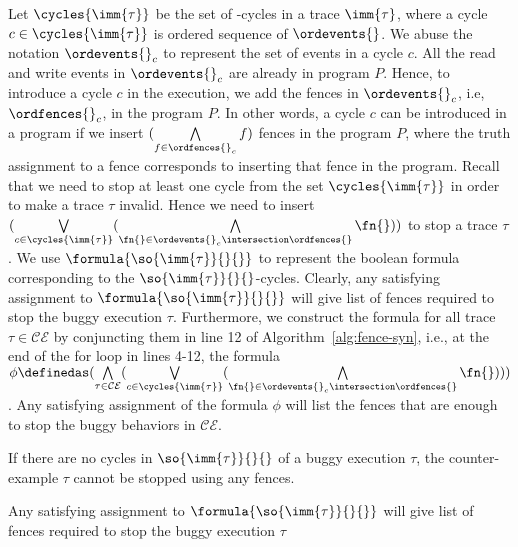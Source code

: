 Let $ \cycles{\imm{\tau}} $ be the set of \lso-cycles in a trace $ \imm{\tau} $, 
where a cycle $ c \in \cycles{\imm{\tau}} $ is ordered sequence of 
$ \ordevents{\sc} $. We abuse the notation $\ordevents{\sc}_c$ to 
represent the set of events in a cycle $ c $. 
All the read and write events in $\ordevents{\sc}_c$ are already in program $ P $. 
Hence, to introduce a cycle $ c $ in the execution, we add the fences in $\ordevents{\sc}_c$, i.e, 
$\ordfences{\sc}_c$, in the program $ P $.
In other words, a cycle $ c $ can be introduced in a program if we insert 
$ (\bigwedge\limits_{f \in \ordfences{\sc}_c} f)$ fences in the program $ P $, 
where the truth assignment to a fence corresponds to inserting that fence 
in the program.
Recall that we need to stop at least one cycle from the set 
$ \cycles{\imm{\tau}} $ in order to make a trace $ \tau $ invalid.
Hence we need to insert $ (\bigvee\limits_{c \in \cycles{\imm{\tau}}} (\bigwedge\limits_{\fn{} \in \ordevents{\sc}_c \intersection 
\ordfences{\sc}} \fn{})) $ to stop a trace $ \tau $. 
We use $\formula{\so{\imm{\tau}}{}{}}$ to represent the boolean formula 
corresponding to the $ \so{\imm{\tau}}{}{} $-cycles.
Clearly, any satisfying assignment to $ \formula{\so{\imm{\tau}}{}{}} $ 
will give list of fences required to stop the buggy execution $ \tau $.
%
Furthermore, we construct the formula for all trace 
$ \tau \in \mathcal{CE} $ by conjuncting them in 
line 12 of Algorithm~\ref{alg:fence-syn}, i.e., 
at the end of the for loop in lines 4-12, the formula 
$ \phi \definedas (\bigwedge\limits_{\tau \in \mathcal{CE}} 
(\bigvee\limits_{c \in \cycles{\imm{\tau}}} 
(\bigwedge\limits_{\fn{} \in \ordevents{\sc}_c \intersection \ordfences{\sc}} \fn{}))) $.
Any satisfying assignment of the formula $\phi$ will list the fences that 
are enough to stop the buggy behaviors in $ \mathcal{CE} $.


\begin{lemma}
	If there are no cycles in $\so{\imm{\tau}}{}{}$ of a buggy execution 
	$\tau$, the counter-example $ \tau $ cannot be stopped using any \cc 
	fences.
\end{lemma}

\begin{theorem}
	Any satisfying assignment to $ \formula{\so{\imm{\tau}}{}{}} $ 
	will give list of fences required to stop the buggy execution $ \tau $
\end{theorem}


